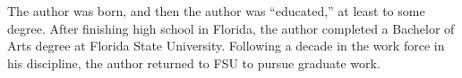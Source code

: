 \documentclass[11pt,expanded,copyright]{fsuthesis}
\begin{document}
%


\begin{biosketch}
The author was born, and then the author was ``educated,'' at least to
some degree.  After finishing high school in Florida, the author
completed a Bachelor of Arts degree at Florida State University.
Following a decade in the work force in his discipline, the author
returned to FSU to pursue graduate work.
\end{biosketch}

\end{document}
